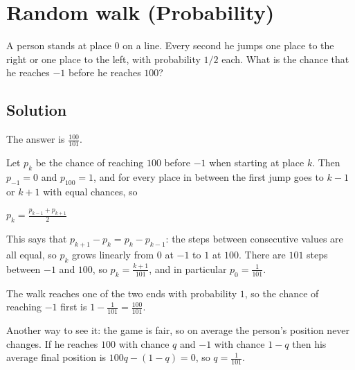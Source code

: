 \section {Random walk (Probability)}

A person stands at place $0$ on a line. Every second he jumps one place to the right or one place to the left, with probability $1/2$ each.
What is the chance that he reaches $-1$ before he reaches $100$?

\subsection{Solution}

The answer is $\frac{100}{101}$.

Let $p_k$ be the chance of reaching $100$ before $-1$ when starting at place $k$. Then $p_{-1} = 0$ and $p_{100} = 1$,
and for every place in between the first jump goes to $k-1$ or $k+1$ with equal chances, so
\begin{center}
$p_k = \frac{p_{k-1} + p_{k+1}}{2}$
\end{center}
This says that $p_{k+1} - p_k = p_k - p_{k-1}$: the steps between consecutive values are all equal, so $p_k$ grows linearly from $0$ at $-1$ to $1$ at $100$.
There are $101$ steps between $-1$ and $100$, so $p_k = \frac{k+1}{101}$, and in particular $p_0 = \frac{1}{101}$.

The walk reaches one of the two ends with probability $1$, so the chance of reaching $-1$ first is $1 - \frac{1}{101} = \frac{100}{101}$.

Another way to see it: the game is fair, so on average the person's position never changes. If he reaches $100$ with chance $q$ and $-1$ with chance $1-q$ then
his average final position is $100q - (1-q) = 0$, so $q = \frac{1}{101}$.
